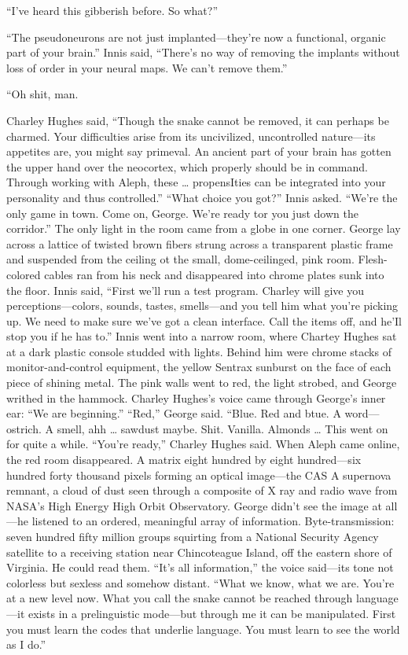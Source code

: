 “I’ve heard this gibberish before. So what?”

“The pseudoneurons are not just implanted—they’re now a functional, organic part of your brain.”
Innis said, “There’s no way of removing the implants without loss of order in your neural maps. We can’t remove them.”

“Oh shit, man.

Charley Hughes said, “Though the snake cannot be removed, it can perhaps be charmed. Your difficulties arise from its uncivilized, uncontrolled nature—its appetites are, you might say primeval. An ancient part of your brain has gotten the upper hand over the neocortex, which properly should be in command. Through working with Aleph, these … propensIties can be integrated into your personality and thus controlled.”
“What choice you got?” Innis asked. “We’re the only game in town. Come on, George. We’re ready tor you just down the corridor.”
The only light in the room came from a globe in one corner. George lay across a lattice of twisted brown fibers strung across a transparent plastic frame and suspended from the ceiling ot the small, dome-ceilinged, pink room. Flesh-colored cables ran from his neck and disappeared into chrome plates sunk into the floor.
Innis said, “First we’ll run a test program. Charley will give you perceptions—colors, sounds, tastes, smells—and you tell him what you’re picking up. We need to make sure we’ve got a clean interface. Call the items off, and he’Il stop you if he has to.”
Innis went into a narrow room, where Chartey Hughes sat at a dark plastic console studded with lights. Behind him were chrome stacks of monitor-and-control equipment, the yellow Sentrax sunburst on the face of each piece of shining metal.
The pink walls went to red, the light strobed, and George writhed in the hammock. Charley Hughes’s voice came through George’s inner ear: “We are beginning.”
“Red,” George said. “Blue. Red and btue. A word—ostrich. A smell, ahh … sawdust maybe. Shit. Vanilla. Almonds …
This went on for quite a while. “You’re ready,” Charley Hughes said.
When Aleph came online, the red room disappeared. A matrix eight hundred by eight hundred—six hundred forty thousand pixels forming an optical image—the CAS A supernova remnant, a cloud of dust seen through a composite of X ray and radio wave from NASA’s High Energy High Orbit Observatory. George didn’t see the image at all—he listened to an ordered, meaningful array of information.
Byte-transmission: seven hundred fifty million groups squirting from a National Security Agency satellite to a receiving station near Chincoteague Island, off the eastern shore of Virginia. He could read them.
“It’s all information,” the voice said—its tone not colorless but sexless and somehow distant. “What we know, what we are. You’re at a new level now. What you call the snake cannot be reached through language—it exists in a prelinguistic mode—but through me it can be manipulated. First you must learn the codes that underlie language. You must learn to see the world as I do.”

